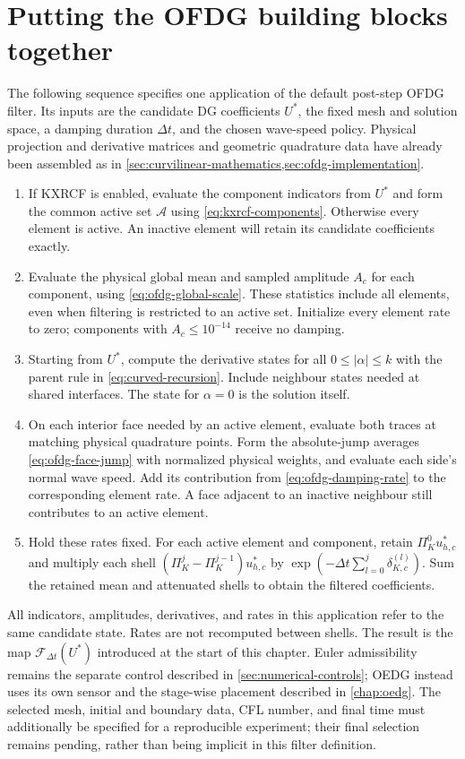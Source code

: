 




\section{Putting the OFDG building blocks together}
\label{sec:ofdg-update-recipe}
The following sequence specifies one application of the default post-step
OFDG filter. Its inputs are the candidate DG coefficients $U^*$, the fixed
mesh and solution space, a damping duration $\Delta t$, and the chosen
wave-speed policy. Physical projection and derivative matrices and geometric
quadrature data have already been assembled as in
\cref{sec:curvilinear-mathematics,sec:ofdg-implementation}.
\begin{enumerate}
 \item If KXRCF is enabled, evaluate the component indicators from $U^*$
 and form the common active set $\mathcal A$ using
 \cref{eq:kxrcf-components}. Otherwise every element is active. An inactive
 element will retain its candidate coefficients exactly.
 \item Evaluate the physical global mean and sampled amplitude $A_c$ for
 each component, using \cref{eq:ofdg-global-scale}. These statistics include
 all elements, even when filtering is restricted to an active set. Initialize
 every element rate to zero; components with $A_c\leq10^{-14}$ receive no
 damping.
 \item Starting from $U^*$, compute the derivative states for all
 $0\leq|\alpha|\leq k$ with the parent rule in
 \cref{eq:curved-recursion}. Include neighbour states needed at shared
 interfaces. The state for $\alpha=0$ is the solution itself.
 \item On each interior face needed by an active element, evaluate both
 traces at matching physical quadrature points. Form the absolute-jump
 averages \cref{eq:ofdg-face-jump} with normalized physical weights, and
 evaluate each side's normal wave speed. Add its contribution from
 \cref{eq:ofdg-damping-rate} to the corresponding element rate. A face
 adjacent to an inactive neighbour still contributes to an active element.
 \item Hold these rates fixed. For each active element and component,
 retain $\Pi_K^0u_{h,c}^*$ and multiply each shell
 $(\Pi_K^j-\Pi_K^{j-1})u_{h,c}^*$ by
 $\exp(-\Delta t\sum_{l=0}^j\delta_{K,c}^{(l)})$. Sum the retained mean
 and attenuated shells to obtain the filtered coefficients.
\end{enumerate}
All indicators, amplitudes, derivatives, and rates in this application refer
to the same candidate state. Rates are not recomputed between shells. The
result is the map $\mathcal F_{\Delta t}(U^*)$ introduced at the start of
this chapter. Euler admissibility remains the separate control described in
\cref{sec:numerical-controls}; OEDG instead uses its own sensor and the
stage-wise placement described in \cref{chap:oedg}. The selected mesh,
initial and boundary data, CFL number, and final time must additionally be
specified for a reproducible experiment; their final selection remains
pending, rather than being implicit in this filter definition.


